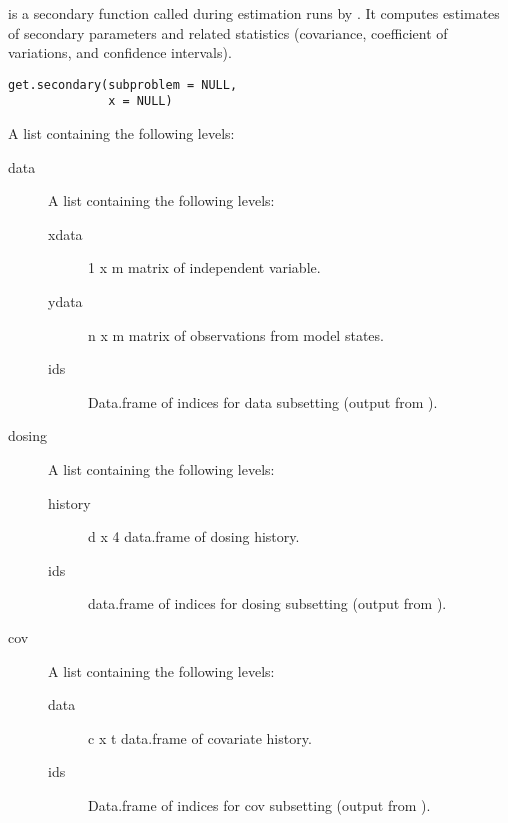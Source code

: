 %
\begin{Description}\relax
{} is a secondary function called during estimation runs by 
. It computes estimates of secondary parameters and related
statistics (covariance, coefficient of variations, and confidence intervals).
\end{Description}
%
\begin{Usage}
\begin{verbatim}
get.secondary(subproblem = NULL,
              x = NULL)
\end{verbatim}
\end{Usage}
%
\begin{Arguments}
\begin{ldescription}
\item[\code{subproblem}] A list containing the following levels:\begin{description}

\item[data] A list containing the following levels:\begin{description}

\item[xdata] 1 x m matrix of independent variable.
\item[ydata] n x m matrix of observations from model states.
\item[ids] Data.frame of indices for data subsetting (output
from ).

\end{description}

\item[dosing] A list containing the following levels:\begin{description}

\item[history] d x 4 data.frame of dosing history.
\item[ids] data.frame of indices for dosing subsetting
(output from ).

\end{description}

\item[cov] A list containing the following levels:\begin{description}

\item[data] c x t data.frame of covariate history.
\item[ids] Data.frame of indices for cov subsetting (output
from ).


\end{description}
\end{description}
\end{ldescription}
\end{Arguments}
